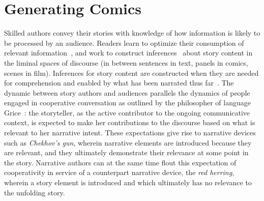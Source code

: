 \section{Generating Comics}

Skilled authors convey their stories with knowledge of how information is
likely to be processed by an audience.  Readers learn to optimize their
consumption of relevant information~\cite{pirolli2007information}, and work
to construct inferences~\cite{magliano2016filling} about story content in
the liminal spaces of discourse (in between sentences in text, panels in
comics, scenes in film). Inferences for story content are constructed when
they are needed for comprehension and enabled by what has
been narrated thus far~\cite{myers1987degree}. The dynamic
between story authors and audiences parallels the dynamics of people
engaged in cooperative conversation as outlined by the philosopher of
language Grice~\cite{grice1975logic}: the storyteller, as the active contributor
to the ongoing communicative context, is expected to make her contributions
to the discourse based on what is relevant to her narrative intent. 
These expectations give rise to narrative devices such as \emph{Chekhov's
gun}, wherein narrative elements are introduced because they are relevant, 
and they ultimately demonstrate their relevance at some point in the story.
Narrative authors can at the same time flout this expectation of 
cooperativity in service of a counterpart narrative device, the 
\emph{red herring}, wherein a story element is introduced and which
ultimately has no relevance to the unfolding story.
% 
% 

